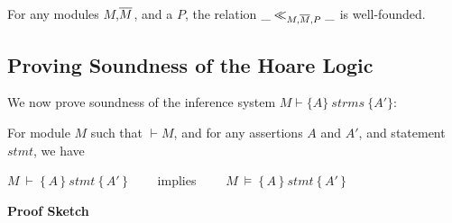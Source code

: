 \begin{auxLemma}
\label{lemma:normal:two}
For any modules $M$,$\overline{M}$,   and  a %
$P$, the relation $\_ \ll_{M,\overline{M},P}  \_$
is well-founded.
\end{auxLemma}

\subsection{Proving Soundness of the Hoare Logic}
\label{sect:prove:sound}
We now prove soundness of the inference system $M \vdash \{ A \}\ strms\  \{ A' \} $:

\begin{theorem}
For module  $M$ %
such that  $\vdash M$, and for any assertions $A$ and $A'$, and statement  $stmt$, we have

\begin{center}
$M\ \vdash\  \{\, A \,  \}\ stmt\  \{\, A' \, \}$ \ \ \ \ implies \ \ \ \ $M\ \models\  \{\, A \,  \}\ stmt\  \{\, A' \, \}$
\end{center}

\end{theorem}


%

\noindent
\vspace{.2cm}
  {\textbf{Proof Sketch}} 

